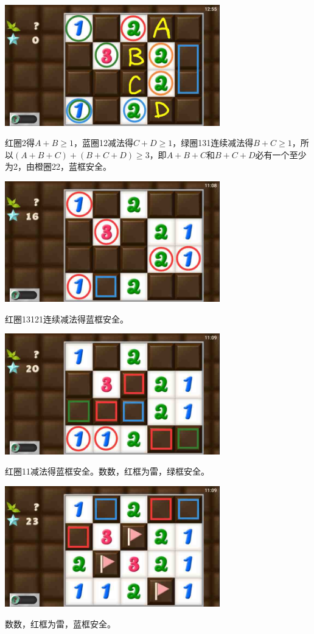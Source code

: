 \subsection{} %
\begin{center}
    \includegraphics[width=0.7\textwidth]{puzzlelow/198-1.jpg}
\end{center}
红圈2得$A+B\ge 1$，蓝圈12减法得$C+D\ge 1$，绿圈131连续减法得$B+C\ge 1$，所以$(A+B+C)+(B+C+D)\ge 3$，即$A+B+C$和$B+C+D$必有一个至少为2，由橙圈22，蓝框安全。
\begin{center}
    \includegraphics[width=0.7\textwidth]{puzzlelow/198-2.jpg}
\end{center}
红圈13121连续减法得蓝框安全。
\begin{center}
    \includegraphics[width=0.7\textwidth]{puzzlelow/198-3.jpg}
\end{center}
红圈11减法得蓝框安全。数数，红框为雷，绿框安全。
\begin{center}
    \includegraphics[width=0.7\textwidth]{puzzlelow/198-4.jpg}
\end{center}
数数，红框为雷，蓝框安全。

